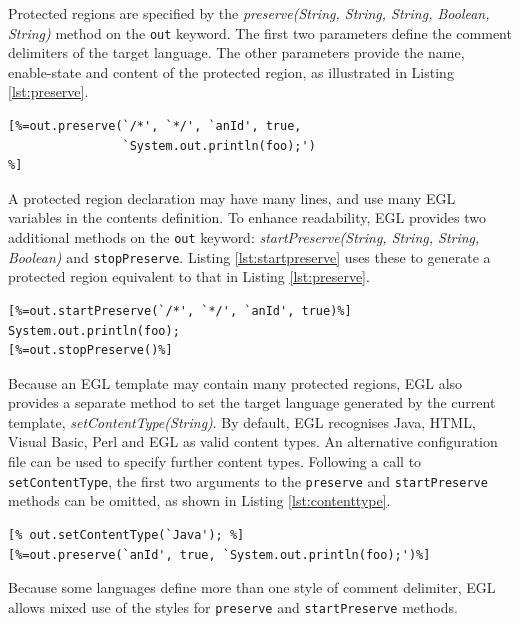 Protected regions are specified by the \emph{preserve(String, String,
  String, Boolean, String)} method on the \verb|out| keyword. The first two parameters define the comment delimiters
of the target language. The other parameters provide the name,
enable-state and content of the protected region, as
illustrated in Listing \ref{lst:preserve}.

\begin{lstlisting}[basicstyle=\ttfamily\footnotesize, tabsize=2, flexiblecolumns=true, caption=Protected region declaration using the preserve method., label=lst:preserve]
[%=out.preserve(`/*', `*/', `anId', true,
                `System.out.println(foo);')
%]
\end{lstlisting}

A protected region declaration may have many lines, and use many EGL
variables in the contents definition.  To enhance readability, EGL
provides two additional methods on the \verb|out| keyword:
\emph{startPreserve(String, String, String, Boolean)} and
\verb|stopPreserve|.  Listing \ref{lst:startpreserve} uses these to
generate a protected region equivalent to that in Listing
\ref{lst:preserve}.

\begin{lstlisting}[basicstyle=\ttfamily\footnotesize, tabsize=2, flexiblecolumns=true, caption=Protected region declaration., label=lst:startpreserve]
[%=out.startPreserve(`/*', `*/', `anId', true)%]
System.out.println(foo);
[%=out.stopPreserve()%]
\end{lstlisting}

Because an EGL template may contain many protected regions, EGL also
provides a separate method to set the target language generated by the
current template, \emph{setContentType(String)}. By default, EGL recognises Java, HTML, Visual Basic,
Perl and EGL as valid content types. An alternative configuration file
can be used to specify further content
types. Following a call to \verb|setContentType|, the first two
arguments to the \verb|preserve| and \verb|startPreserve| methods can
be omitted, as shown in Listing \ref{lst:contenttype}.

\begin{lstlisting}[basicstyle=\ttfamily\footnotesize, tabsize=2, flexiblecolumns=true, caption=Setting the content type., label=lst:contenttype]
[% out.setContentType(`Java'); %]
[%=out.preserve(`anId', true, `System.out.println(foo);')%]
\end{lstlisting}

Because some languages define more than one style of comment
delimiter, EGL allows mixed use of  the styles for \verb|preserve| and
\verb|startPreserve| methods.

